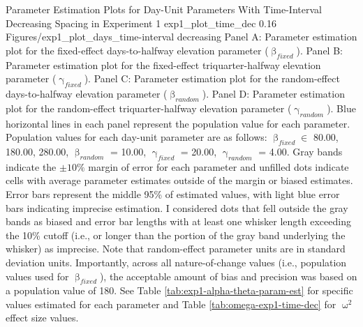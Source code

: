 \documentclass[
12pt, %
twoside,
english]{guelphthesis}
\theoremstyle{definition}
\theoremstyle{definition}
\theoremstyle{definition}
\theoremstyle{definition}
\theoremstyle{remark}
\begin{document}
\begin{apaFigure}
[portrait]
[samepage]
[-0.2cm] %
{Parameter Estimation Plots for Day-Unit Parameters With Time-Interval Decreasing Spacing in Experiment 1} 
{exp1_plot_time_dec}
{0.16} %
{Figures/exp1_plot_days_time-interval decreasing} %
{Panel A: Parameter estimation plot for the fixed-effect days-to-halfway elevation parameter ($\upbeta_{fixed}$). Panel B: Parameter estimation plot for the fixed-effect triquarter-halfway elevation parameter ($\upgamma_{fixed}$). Panel C: Parameter estimation plot for the random-effect days-to-halfway elevation parameter ($\upbeta_{random}$). Panel D: Parameter estimation plot for the random-effect triquarter-halfway elevation parameter ($\upgamma_{random}$). Blue horizontal lines in each panel represent the population value for each parameter. Population values for each day-unit parameter are as follows: $\upbeta_{fixed} \in$ {80.00, 180.00, 280.00}, $\upbeta_{random}$ = 10.00, $\upgamma_{fixed}$ = 20.00, $\upgamma_{random}$ = 4.00. Gray bands indicate the $\pm 10\%$ margin of error for each parameter and unfilled dots indicate cells with average parameter estimates outside of the margin or biased estimates. Error bars represent the middle 95\% of estimated values, with light blue error bars indicating imprecise estimation. I considered dots that fell outside the gray bands as biased and error bar lengths with at least one whisker length exceeding the 10\% cutoff (i.e., or longer than the portion of the gray band underlying the whisker) as imprecise. Note that random-effect parameter units are in standard deviation units. Importantly, across all nature-of-change values (i.e., population values used for $\upbeta_{fixed}$), the acceptable amount of bias and precision was based on a population value of 180. See Table \ref{tab:exp1-alpha-theta-param-est} for specific values estimated for each parameter and Table \ref{tab:omega-exp1-time-dec} for $\upomega^2$ effect size values.}
\end{apaFigure}
\end{document}
